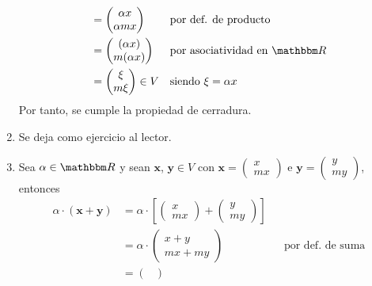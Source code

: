 \begin{examplebox}{}{}
\begin{enumerate}[label=\roman*), topsep=6pt, itemsep=0pt]
\begin{align*}
            & = \begin{pmatrix}
                \alpha x \\
                \alpha mx
            \end{pmatrix} && \text{por def. de producto} \\
            & = \begin{pmatrix}
                (\alpha x) \\
                m(\alpha x)
            \end{pmatrix} && \text{por asociatividad en $\RR$} \\
            & = \begin{pmatrix}
                \xi \\
                m\xi
            \end{pmatrix} \in V && \text{siendo $\xi = \alpha x$}
        \end{align*}
        Por tanto, se cumple la propiedad de cerradura.
        \item Se deja como ejercicio al lector.
        \item Sea $\alpha \in \RR$ y sean $\mathbf{x}$, $\mathbf{y} \in V$ con $\mathbf{x} = \begin{pmatrix}
            x \\
            mx
        \end{pmatrix}$ e $\mathbf{y} = \begin{pmatrix}
            y \\
            my
        \end{pmatrix}$, entonces
        \begin{align*}
            \alpha \cdot (\mathbf{x} + \mathbf{y}) & = \alpha \cdot \left[ \begin{pmatrix}
                x \\
                mx
            \end{pmatrix} + \begin{pmatrix}
                y \\
                my
            \end{pmatrix} \right] \\
            & = \alpha \cdot \begin{pmatrix}
                x + y \\
                mx + my
            \end{pmatrix} && \text{por def. de suma} \\
            & = \begin{pmatrix}

\end{pmatrix}
\end{align*}
\end{enumerate}
\end{examplebox}

